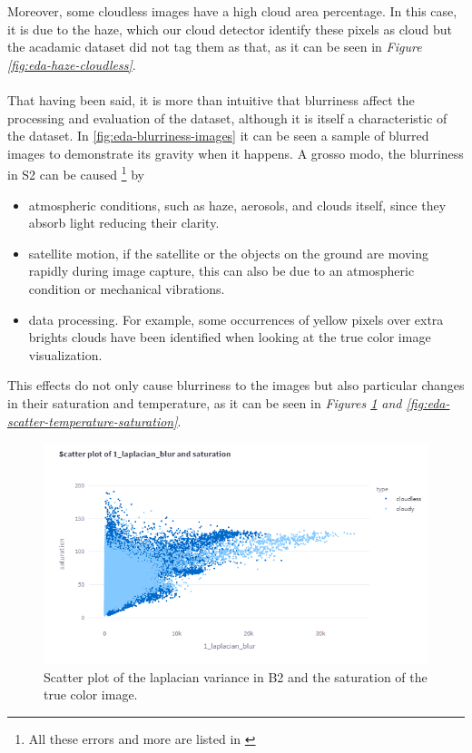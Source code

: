 Moreover, some cloudless images have a high cloud area percentage. In this case, it is due to the haze, which our cloud detector identify these pixels as cloud but the acadamic dataset did not tag them as that, as it can be seen in \textit{Figure \ref{fig:eda-haze-cloudless}}.
\\
\\
That having been said, it is more than intuitive that blurriness affect the processing and evaluation of the dataset, although it is itself a characteristic of the dataset. In \ref{fig:eda-blurriness-images} it can be seen a sample of blurred images to demonstrate its gravity when it happens. A grosso modo, the blurriness in S2 can be caused \footnote{All these errors and more are listed in \cite{Sentinel2Anomalies}} by
\begin{itemize}
	\item atmospheric conditions, such as haze, aerosols, and clouds itself, since they absorb light reducing their clarity.
	\item satellite motion, if the satellite or the objects on the ground are moving rapidly during image capture, this can also be due to an atmospheric condition or mechanical vibrations.
	\item data processing. For example, some occurrences of yellow pixels over extra brights clouds have been identified when looking at the true color image visualization.
\end{itemize}
This effects do not only cause blurriness to the images but also particular changes in their saturation and temperature, as it can be seen in \textit{Figures \ref{fig:eda-scatter-blur-saturation} and \ref{fig:eda-scatter-temperature-saturation}}.
\begin{figure}[H]
	\centering
	\includegraphics[width=13cm]{imgs/eda/blur-saturation}
	\caption{Scatter plot of the laplacian variance in B2 and the saturation of the true color image.}
	\label{fig:eda-scatter-blur-saturation}
\end{figure} 

